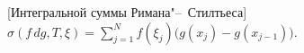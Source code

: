[Интегральной суммы Римана"--~Стилтьеса]
		$\sigma(f\,dg,T,\xi)=\sum\limits_{j=1}^Nf(\xi_j)\big(g(x_j)-g(x_{j-1})\big)$.
	